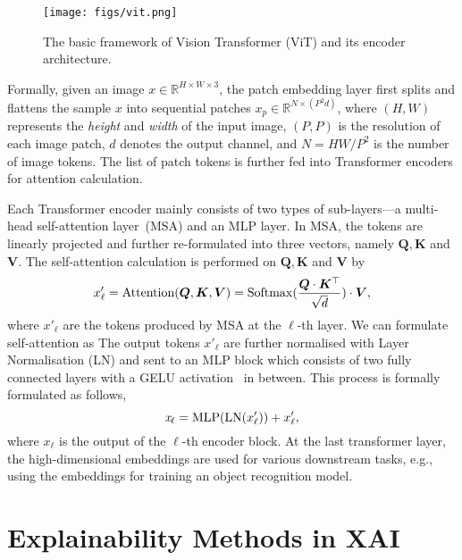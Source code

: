 \documentclass[dvipsnames]{article}
\renewcommand{\cite}[1]{\autocite{#1}}
\begin{document}
\begin{figure}[tb]
	\centering
	\texttt{[image: figs/vit.png]}
	\caption{The basic framework of Vision Transformer (ViT) \cite{dosovitskiy2020image} and its encoder architecture.}
	\label{ViT}
\end{figure}




Formally, given an image $\mathit{x} \in \mathbb{R}^{H \times W \times 3}$, the patch embedding layer first splits and flattens the sample $\mathit{x}$ into sequential patches $\mathit{x}_p \in \mathbb{R}^{N \times (P^2 d)}$, where $\mathit{(H,W)}$ represents the \emph{height} and \emph{width} of the input image, $(P, P)$ is the resolution of each image patch, $\mathit{d}$ denotes the output channel, and $N = {HW}/{P^2}$ is the number of image tokens.
The list of patch tokens is further fed into Transformer encoders for attention calculation.

Each Transformer encoder mainly consists of two types of sub-layers---a multi-head self-attention layer~(MSA) and an MLP layer.
In MSA, the tokens are linearly projected and further re-formulated into three vectors, namely $\bm{Q}, \bm{K}$ and $\bm{V}$. The self-attention calculation is performed on $\bm{Q}, \bm{K}$ and $\bm{V}$ by
\begin{equation}
    x'_\ell = {\rm Attention}(\bm{Q}, \bm{K}, \bm{V}) = {\rm Softmax}(\frac{\bm{Q} \cdot \bm{K}^\top}{\sqrt{d}})\cdot\bm{V},
    \label{eq:attn}
\end{equation}
where $x'_\ell$ are the tokens produced by MSA at the $\ell$-th layer.
We can formulate self-attention as
The output tokens  $x'_\ell$ are further normalised with Layer Normalisation (LN) and sent to an MLP block which consists of two fully connected layers with a GELU activation~\cite{hendrycks2016gaussian} in between. This process is formally formulated as follows,
\begin{equation}
    \mathit{x}_\ell = {\rm MLP}({\rm LN}(x'_\ell)) + x'_\ell,
    \label{eq:ffn}
\end{equation}
where $x_\ell$ is the output of the $\ell$-th encoder block.
At the last transformer layer, the high-dimensional embeddings are used for various downstream tasks, e.g., using the embeddings for training an object recognition model.



\section{Explainability Methods in XAI}
\end{document}
